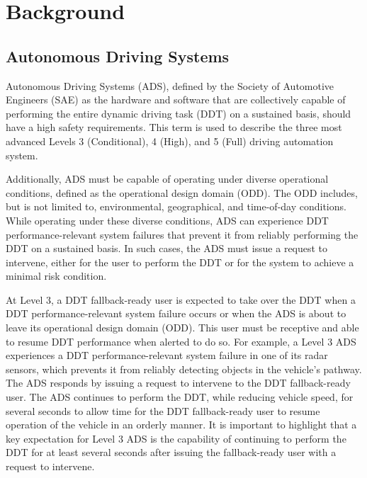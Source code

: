 \section{Background}  \label{Background}



\subsection{Autonomous Driving Systems} \label{Background:AutonomousDrivingSystems}


Autonomous Driving Systems (ADS), defined by the Society of Automotive Engineers (SAE) as the hardware and software that are collectively capable of performing the entire dynamic driving task (DDT) on a sustained basis, should have a high safety requirements.
This term is used to describe the three most advanced Levels 3 (Conditional), 4 (High), and 5 (Full) driving automation system.

Additionally, ADS must be capable of operating under diverse operational conditions, defined as the operational design domain (ODD). The ODD includes, but is not limited to, environmental, geographical, and time-of-day conditions.
While operating under these diverse conditions, ADS can experience DDT performance-relevant system failures that prevent it from reliably performing the DDT on a sustained basis.
In such cases, the ADS must issue a request to intervene, either for the user to perform the DDT or for the system to achieve a minimal risk condition.

At Level 3, a DDT fallback-ready user is expected to take over the DDT when a DDT performance-relevant system failure occurs or when the ADS is about to leave its operational design domain (ODD). This user must be receptive and able to resume DDT performance when alerted to do so.
For example, a Level 3 ADS experiences a DDT performance-relevant system failure in one of its radar sensors, which prevents it from reliably detecting objects in the vehicle's pathway. The ADS responds by issuing a request to intervene to the DDT fallback-ready user. The ADS continues to perform the DDT, while reducing vehicle speed, for several seconds to allow time for the DDT fallback-ready user to resume operation of the vehicle in an orderly manner. It is important to highlight that a key expectation for Level 3 ADS is the capability of continuing to perform the DDT for at least several seconds after issuing the fallback-ready user with a request to intervene.

